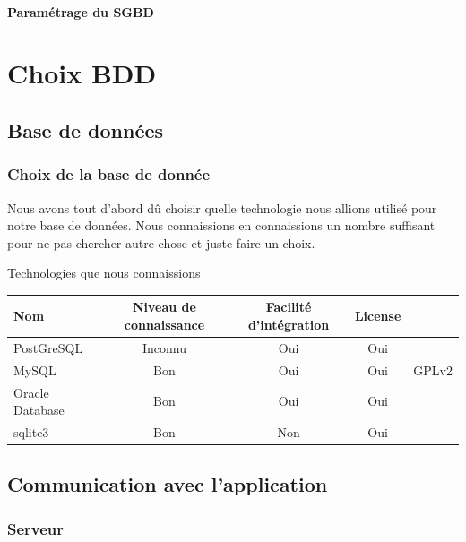 \documentclass[a4paper, 11pt]{report}
\begin{document}
		\subsubsection{Paramétrage du SGBD}
\chapter{Choix BDD}
\section{Base de données}
\subsection{Choix de la base de donnée}
	Nous avons tout d'abord dû choisir quelle technologie nous allions utilisé pour notre base de données.
	Nous connaissions en connaissions un nombre suffisant pour ne pas chercher autre chose et juste faire un choix.
	\par
	\begin{center}
		Technologies que nous connaissions
		\par
		\begin{tabular}{|l|c|c|c|c|}
			\hline
			Nom & Niveau de connaissance & Facilité d'intégration & License \\
			\hline
			PostGreSQL & Inconnu & Oui & Oui\\
			\hline
			MySQL & Bon & Oui & Oui & GPLv2\\
			\hline
			Oracle Database & Bon & Oui & Oui \\
			\hline
			sqlite3 & Bon & Non & Oui \\
			\hline
		\end{tabular}
	\end{center}
\section{Communication avec l'application}
\subsection{Serveur}
\end{document}
